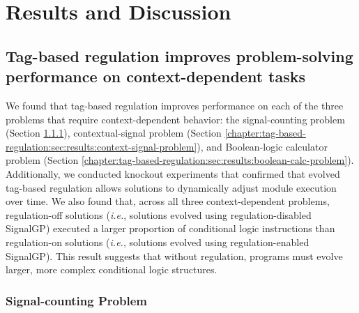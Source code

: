 
\section{Results and Discussion}

\begin{raggedright}
\subsection{Tag-based regulation improves problem-solving performance on context-dependent tasks}
\end{raggedright}

We found that tag-based regulation improves performance on each of the three problems that require context-dependent behavior: the signal-counting problem (Section \ref{chapter:tag-based-regulation:sec:results:signal-counting-problem}), contextual-signal problem (Section \ref{chapter:tag-based-regulation:sec:results:context-signal-problem}), and Boolean-logic calculator problem (Section \ref{chapter:tag-based-regulation:sec:results:boolean-calc-problem}). 
Additionally, we conducted knockout experiments that confirmed that evolved tag-based regulation allows solutions to dynamically adjust module execution over time. 
We also found that, across all three context-dependent problems, regulation-off solutions (\textit{i.e.}, solutions evolved using regulation-disabled SignalGP) executed a larger proportion of conditional logic instructions than regulation-on solutions (\textit{i.e.}, solutions evolved using regulation-enabled SignalGP). 
This result suggests that without regulation, programs must evolve larger, more complex conditional logic structures. 

\subsubsection{Signal-counting Problem}
\label{chapter:tag-based-regulation:sec:results:signal-counting-problem}



